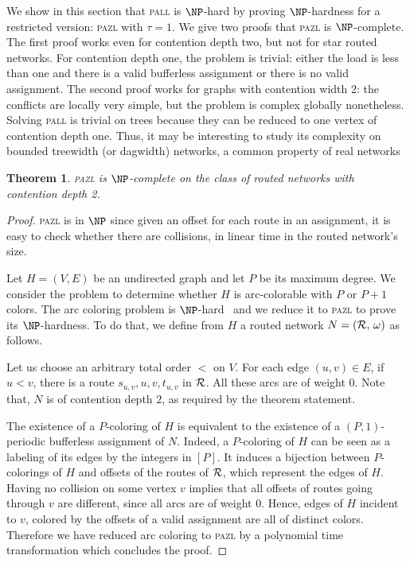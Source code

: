 \documentclass[a4paper,10pt]{journal}
\newtheorem{theorem}{Theorem}
\newcommand\pazl{\textsc{pazl}\xspace}
\newcommand\pall{\textsc{pall}\xspace}
\begin{document}
	We show in this section that \pall is $\NP$-hard by proving $\NP$-hardness for a restricted version: \pazl with $\tau = 1$. We give two proofs that \pazl is $\NP$-complete.
	The first proof works even for contention depth two, but not for star routed networks.
	 For contention depth one, the problem is trivial: either the load is less than one and there is a valid bufferless assignment or there is no valid assignment. 
	 The second proof works for graphs with contention width $2$: the conflicts are locally very simple, but the problem is complex globally nonetheless. Solving \pall is trivial on trees because they can be reduced to one vertex of contention depth one. Thus, it may be interesting to study its complexity on bounded treewidth (or dagwidth) networks, a common property of real networks~\cite{de2011treewidth}
 

 \begin{theorem}
\pazl is $\NP$-complete on the class of routed networks with contention depth 2.
\end{theorem}
 \begin{proof}
 \pazl is in $\NP$ since given an offset for each route in an assignment, it is easy to check whether there are collisions, in linear time in the routed network's size.
 
  Let $H=(V,E)$ be an undirected graph and let $P$ be its maximum degree. We consider the problem to determine whether $H$ is arc-colorable with $P$ or $P+1$ colors. The arc coloring problem is $\NP$-hard~\cite{holyer1981np} and we reduce it to \pazl to prove its $\NP$-hardness. To do that, we define from $H$ a routed network $N = ({\cal R},\, \omega)$ as follows. 

  Let us choose an arbitrary total order $<$ on $V$.
  For each edge $(u,v) \in E$, if $u<v$, there is a route $s_{u,v},u,v,t_{u,v}$ in ${\cal R}$. 
  All these arcs are of weight $0$. Note that, $N$ is of contention depth $2$, as required by the theorem statement. 

  The existence of a $P$-coloring of $H$ is equivalent to the existence of a $(P,1)$-periodic bufferless assignment of $N$. Indeed, a $P$-coloring of $H$ can be seen as a labeling of its edges by the integers in $[P]$. It induces a bijection between $P$-colorings of $H$ and offsets of the routes of ${\cal R}$, which represent the edges of $H$. Having no collision on some vertex $v$ implies that all offsets of routes going through $v$ are different, since all arcs are of weight $0$. Hence, edges of $H$ incident to $v$, colored by the offsets of a valid assignment are all of distinct colors. Therefore we have reduced arc coloring to \pazl by a polynomial time transformation which concludes the proof. 
 \end{proof}
 
\end{document}
